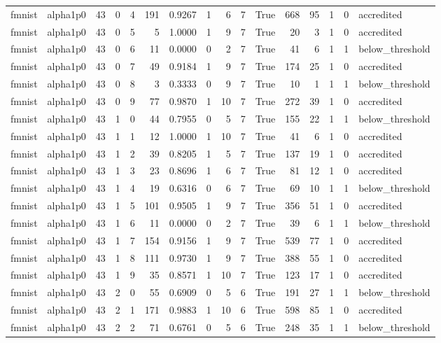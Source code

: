 \begin{tabular}{llrrrrrrrrrrrrrl}
fmnist & alpha1p0 & 43 & 0 & 4 & 191 & 0.9267 & 1 & 6 & 7 & True & 668 & 95 & 1 & 0 & accredited \\
fmnist & alpha1p0 & 43 & 0 & 5 & 5 & 1.0000 & 1 & 9 & 7 & True & 20 & 3 & 1 & 0 & accredited \\
fmnist & alpha1p0 & 43 & 0 & 6 & 11 & 0.0000 & 0 & 2 & 7 & True & 41 & 6 & 1 & 1 & below\_threshold \\
fmnist & alpha1p0 & 43 & 0 & 7 & 49 & 0.9184 & 1 & 9 & 7 & True & 174 & 25 & 1 & 0 & accredited \\
fmnist & alpha1p0 & 43 & 0 & 8 & 3 & 0.3333 & 0 & 9 & 7 & True & 10 & 1 & 1 & 1 & below\_threshold \\
fmnist & alpha1p0 & 43 & 0 & 9 & 77 & 0.9870 & 1 & 10 & 7 & True & 272 & 39 & 1 & 0 & accredited \\
fmnist & alpha1p0 & 43 & 1 & 0 & 44 & 0.7955 & 0 & 5 & 7 & True & 155 & 22 & 1 & 1 & below\_threshold \\
fmnist & alpha1p0 & 43 & 1 & 1 & 12 & 1.0000 & 1 & 10 & 7 & True & 41 & 6 & 1 & 0 & accredited \\
fmnist & alpha1p0 & 43 & 1 & 2 & 39 & 0.8205 & 1 & 5 & 7 & True & 137 & 19 & 1 & 0 & accredited \\
fmnist & alpha1p0 & 43 & 1 & 3 & 23 & 0.8696 & 1 & 6 & 7 & True & 81 & 12 & 1 & 0 & accredited \\
fmnist & alpha1p0 & 43 & 1 & 4 & 19 & 0.6316 & 0 & 6 & 7 & True & 69 & 10 & 1 & 1 & below\_threshold \\
fmnist & alpha1p0 & 43 & 1 & 5 & 101 & 0.9505 & 1 & 9 & 7 & True & 356 & 51 & 1 & 0 & accredited \\
fmnist & alpha1p0 & 43 & 1 & 6 & 11 & 0.0000 & 0 & 2 & 7 & True & 39 & 6 & 1 & 1 & below\_threshold \\
fmnist & alpha1p0 & 43 & 1 & 7 & 154 & 0.9156 & 1 & 9 & 7 & True & 539 & 77 & 1 & 0 & accredited \\
fmnist & alpha1p0 & 43 & 1 & 8 & 111 & 0.9730 & 1 & 9 & 7 & True & 388 & 55 & 1 & 0 & accredited \\
fmnist & alpha1p0 & 43 & 1 & 9 & 35 & 0.8571 & 1 & 10 & 7 & True & 123 & 17 & 1 & 0 & accredited \\
fmnist & alpha1p0 & 43 & 2 & 0 & 55 & 0.6909 & 0 & 5 & 6 & True & 191 & 27 & 1 & 1 & below\_threshold \\
fmnist & alpha1p0 & 43 & 2 & 1 & 171 & 0.9883 & 1 & 10 & 6 & True & 598 & 85 & 1 & 0 & accredited \\
fmnist & alpha1p0 & 43 & 2 & 2 & 71 & 0.6761 & 0 & 5 & 6 & True & 248 & 35 & 1 & 1 & below\_threshold \\

\end{tabular}
